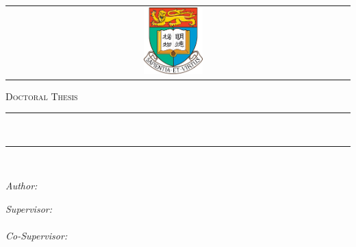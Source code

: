 \begin{titlepage}
\addtocounter{page}{-1}
\begin{center}

\begin{tabular}{cc}
    \includegraphics[align=c, width=0.18\textwidth]{Covers/hkulogo.png} &  
    {\scshape \huge \darkred{\univname}} %
\end{tabular}

\vspace{0.5cm}
\textsc{\Large Doctoral Thesis}\\[0.5cm] %


\rule[0.4cm]{13cm}{0.1pt}\\%
{\huge \bfseries \ttitle\par}\vspace{0.4cm} %
\rule{13cm}{0.1pt}\\ \vspace{1.5cm}
 
\begin{minipage}[t]{0.4\textwidth}
\begin{flushleft} \large
\emph{Author:}\\
\href{http://#}{\authorname} %
\end{flushleft}
\end{minipage}
\begin{minipage}[t]{0.4\textwidth}
\begin{flushright} \large
\emph{Supervisor:} \\
\href{https://www.eee.hku.hk/~elam/}{\supname} \\ %
\emph{Co-Supervisor:} \\
\href{https://www.eee.hku.hk/~hso/}{\cosupname} %
\end{flushright}
\end{minipage}\\[1.6cm]
 

\end{center}
\end{titlepage}
